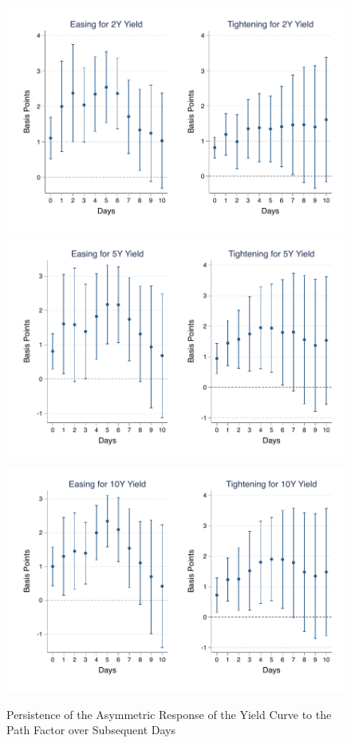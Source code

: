 \documentclass{article}
\begin{document}
\begin{figure}[tbph]
	\begin{center}
		\caption{Persistence of the Asymmetric Response of the Yield Curve to the Path Factor over Subsequent Days}
		\label{fig:persistasypth}
		\includegraphics[trim={0.6cm 0cm 0.5cm 0cm},clip,height=.2\textheight,width=1\textwidth]{persistasypthgmxn02yr} \\
		\includegraphics[trim={0.6cm 0cm 0.5cm 0cm},clip,height=.2\textheight,width=1\textwidth]{persistasypthgmxn05yr} \\
		\includegraphics[trim={0.6cm 0cm 0.5cm 0cm},clip,height=.2\textheight,width=1\textwidth]{persistasypthgmxn10yr} \\

\end{center}
\end{figure}
\end{document}
